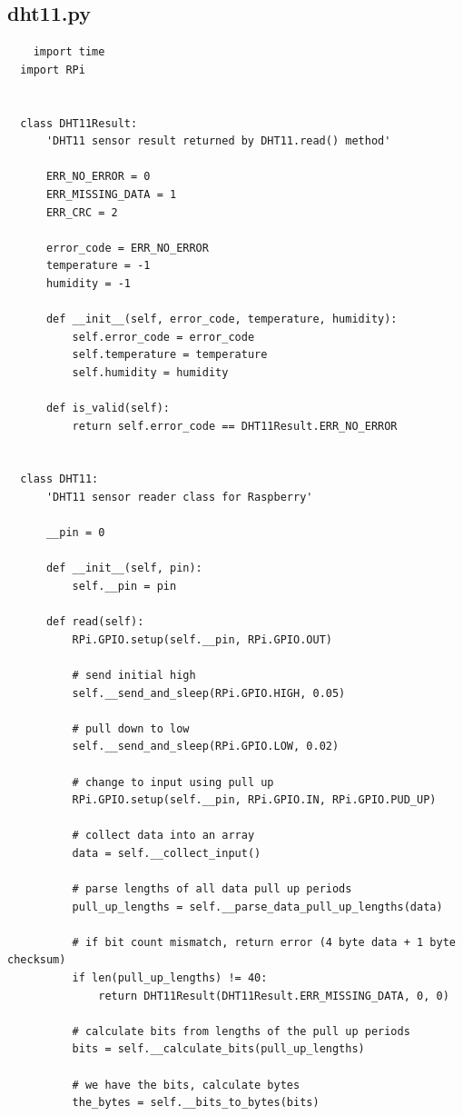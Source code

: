 \documentclass[10pt,a4paper]{article}
\begin{document}
\subsection{dht11.py}
\begin{verbatim}
    import time
  import RPi


  class DHT11Result:
      'DHT11 sensor result returned by DHT11.read() method'

      ERR_NO_ERROR = 0
      ERR_MISSING_DATA = 1
      ERR_CRC = 2

      error_code = ERR_NO_ERROR
      temperature = -1
      humidity = -1

      def __init__(self, error_code, temperature, humidity):
          self.error_code = error_code
          self.temperature = temperature
          self.humidity = humidity

      def is_valid(self):
          return self.error_code == DHT11Result.ERR_NO_ERROR


  class DHT11:
      'DHT11 sensor reader class for Raspberry'

      __pin = 0

      def __init__(self, pin):
          self.__pin = pin

      def read(self):
          RPi.GPIO.setup(self.__pin, RPi.GPIO.OUT)

          # send initial high
          self.__send_and_sleep(RPi.GPIO.HIGH, 0.05)

          # pull down to low
          self.__send_and_sleep(RPi.GPIO.LOW, 0.02)

          # change to input using pull up
          RPi.GPIO.setup(self.__pin, RPi.GPIO.IN, RPi.GPIO.PUD_UP)

          # collect data into an array
          data = self.__collect_input()

          # parse lengths of all data pull up periods
          pull_up_lengths = self.__parse_data_pull_up_lengths(data)

          # if bit count mismatch, return error (4 byte data + 1 byte checksum)
          if len(pull_up_lengths) != 40:
              return DHT11Result(DHT11Result.ERR_MISSING_DATA, 0, 0)

          # calculate bits from lengths of the pull up periods
          bits = self.__calculate_bits(pull_up_lengths)

          # we have the bits, calculate bytes
          the_bytes = self.__bits_to_bytes(bits)


\end{verbatim}
\end{document}
